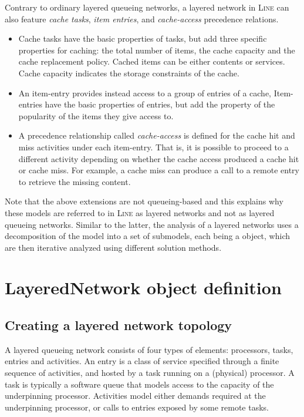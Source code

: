 Contrary to ordinary layered queueing networks, a layered network in \textsc{Line} can also feature \textit{cache tasks}, \textit{item entries}, and \textit{cache-access} precedence relations. 
\begin{itemize}
    \item Cache tasks have the basic properties of tasks, but add three specific properties for caching: the total number of items, the cache capacity and the cache replacement policy. Cached items can be either contents or services. Cache capacity indicates the storage constraints of the cache.
    \item An {item-entry} provides instead access to a group of entries of a cache, Item-entries have the basic properties of entries, but add the property of the popularity of the items they give access to. 
    \item A precedence relationship called \emph{cache-access} is defined for the cache hit and miss activities under each item-entry. That is, it is possible to proceed to a different activity depending on whether the cache access produced a cache hit or cache miss. For example, a cache miss can produce a call to a remote entry to retrieve the missing content.
\end{itemize}
Note that the above extensions are not queueing-based and this explains why these models are referred to in \textsc{Line} as layered networks and not as layered queueing networks. Similar to the latter, the analysis of a layered networks uses a decomposition of the model into a set of submodels, each being a  object,  which are then iterative analyzed using different solution methods.

\section{LayeredNetwork object definition}
\label{layerednetwork-object-definition}

\subsection{Creating a layered network topology}
A layered queueing network consists of four types of elements: processors, tasks, entries and activities. An entry is a class of service specified through a finite sequence of activities, and hosted by a task running on a (physical) processor. A task is typically a software queue that models access to the capacity of the underpinning processor. Activities model either demands required at the underpinning processor, or calls to entries exposed by some remote tasks.

